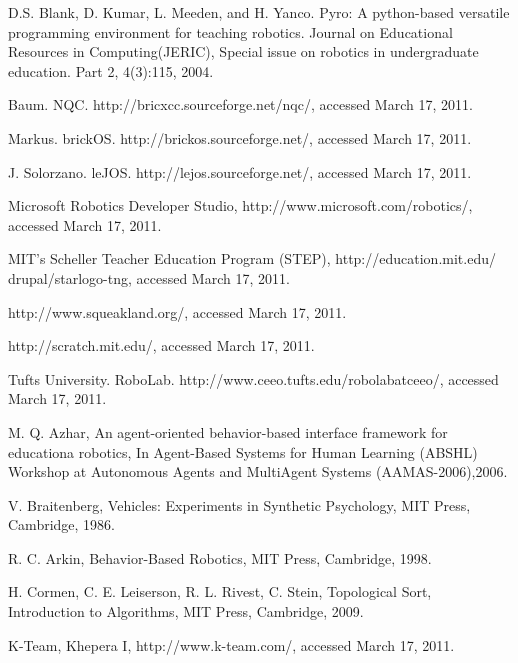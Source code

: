 
\begin{thebibliography}{19}



 D.S. Blank, D. Kumar, L. Meeden, and H. Yanco. Pyro: A python-based versatile programming environment for teaching robotics. Journal on Educational Resources in Computing(JERIC), Special issue on robotics in undergraduate education. Part 2, 4(3):115, 2004.

 Baum. NQC. http://bricxcc.sourceforge.net/nqc/, accessed March 17, 2011.

 Markus. brickOS. http://brickos.sourceforge.net/, accessed March 17, 2011.

 J. Solorzano. leJOS. http://lejos.sourceforge.net/, accessed March 17, 2011.

 Microsoft Robotics Developer Studio, http://www.microsoft.com/robotics/, accessed March 17, 2011.

 MIT's Scheller Teacher Education Program (STEP), http://education.mit.edu/ drupal/starlogo-tng, accessed March 17, 2011.

 http://www.squeakland.org/, accessed March 17, 2011.

 http://scratch.mit.edu/, accessed March 17, 2011.

 Tufts University. RoboLab. http://www.ceeo.tufts.edu/robolabatceeo/, accessed March 17, 2011.

 M. Q. Azhar, An agent-oriented behavior-based interface framework for educationa robotics, In Agent-Based Systems for Human Learning (ABSHL) Workshop at Autonomous Agents and MultiAgent Systems (AAMAS-2006),2006.

 V. Braitenberg, Vehicles: Experiments in Synthetic Psychology, MIT Press, Cambridge, 1986.

 R. C. Arkin, Behavior-Based Robotics, MIT Press, Cambridge, 1998.

  H. Cormen, C. E. Leiserson, R. L. Rivest, C. Stein, Topological Sort, Introduction to Algorithms, MIT Press, Cambridge, 2009.

 K-Team, Khepera I, http://www.k-team.com/, accessed March 17, 2011. 


\end{thebibliography}

